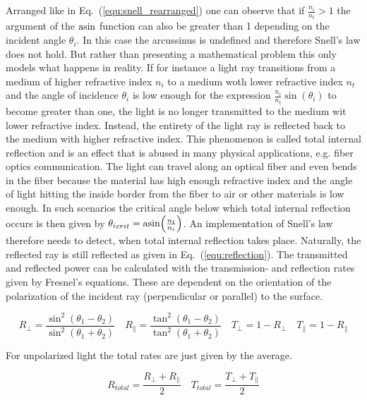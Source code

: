\documentclass[a4paper,10pt]{article}
\newcommand{\equref}[1]{Eq.~(\ref{#1})}
\begin{document}
    Arranged like in \equref{equ:snell_rearranged} one can observe
    that if $\frac{n_i}{n_t} > 1$ the argument of the $\asin$ function
    can also be greater than 1 depending on the incident angle
    $\theta_i$.
    In this case the arcussinus is undefined and therefore Snell's 
    law does not hold.
    But rather than presenting a mathematical problem this only
    models what happens in reality.
    If for instance a light ray transitions from a medium of higher
    refractive index $n_i$ to a medium woth lower refractive index
    $n_t$ and the angle of incidence $\theta_i$ is low enough
    for the expression $\frac{n_i}{n_t} \sin(\theta_i)$ to become
    greater than one, the light is no longer transmitted to the 
    medium wit lower refractive index.
    Instead, the entirety of the light ray is reflected back to the
    medium with higher refractive index.
    This phenomenon is called total internal reflection and is an 
    effect that is abused in many physical applications, e.g.
    fiber optics communication.
    The light can travel along an optical fiber and even bends in the fiber
    because the material has high enough refractive index and the angle
    of light hitting the inside border from the fiber to air or other
    materials is low enough.
    In such scenarios the critical angle below which total internal reflection occurs is
    then given by ${\theta_i}_{crit} = \asin(\frac{n_t}{n_i})$. 
    An implementation of Snell's law therefore needs to detect, when
    total internal reflection takes place.
    Naturally, the reflected ray is still reflected as given in
    \equref{equ:reflection}.
    The transmitted and reflected power can be calculated with the transmission- and
    reflection rates given by Fresnel's equations.
    These are dependent on the orientation of the polarization of the incident ray
    (perpendicular or parallel) to the surface.

    \begin{equation}
        \label{equ:fresnel}
		R_{\perp} = \frac{\sin^2(\theta_1 - \theta_2)}{\sin^2(\theta_1 + \theta_2)} \quad
		R_{\parallel} = \frac{\tan^2(\theta_1 - \theta_2)}{\tan^2(\theta_1 + \theta_2)} \quad
		T_{\perp} = 1 - R_{\perp} \quad
		T_{\parallel} = 1 - R_{\parallel}
    \end{equation}

    For unpolarized light the total rates are just given by the average.
    
    \begin{equation}
        \label{equ:fresnel_unpolarized}
		R_{total} = \frac{R_{\perp} + R_{\parallel}}{2} \quad
		T_{total} = \frac{T_{\perp} + T_{\parallel}}{2}
    \end{equation}
    
\end{document}
